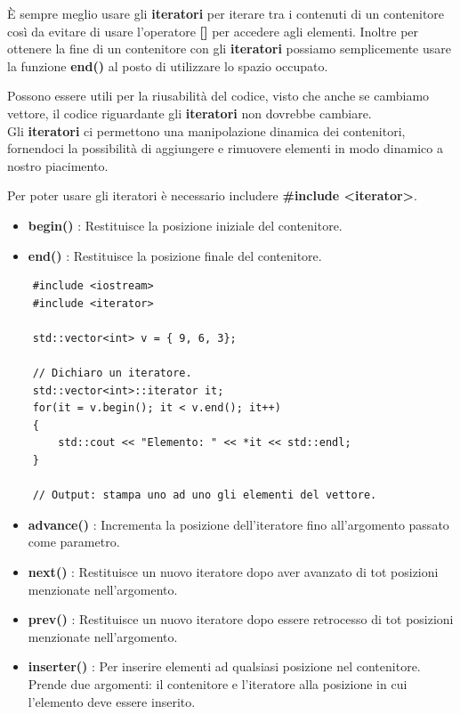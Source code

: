 \vspace{-3.69cm}

\textsf{\small È sempre meglio usare gli \textbf{iteratori} per iterare tra i contenuti di un contenitore così da evitare di usare l'operatore \textbf{[]} per accedere agli elementi. Inoltre per ottenere la fine di un contenitore con gli \textbf{iteratori} possiamo semplicemente usare la funzione \textbf{end()} al posto di utilizzare lo spazio occupato. } \break

\textsf{\small Possono essere utili per la riusabilità del codice, visto che anche se cambiamo vettore, il codice riguardante gli \textbf{iteratori} non dovrebbe cambiare.} \\

\textsf{\small Gli \textbf{iteratori} ci permettono una manipolazione dinamica dei contenitori, fornendoci la possibilità di aggiungere e rimuovere elementi in modo dinamico a nostro piacimento.} \break

\textsf{\small Per poter usare gli iteratori è necessario includere \textbf{\#include <iterator>}.} \\

\begin{itemize}
	\item \textsf{\small \textbf{begin()} : Restituisce la posizione iniziale del contenitore.}
	\item \textsf{\small \textbf{end()} : Restituisce la posizione finale del contenitore.}
\end{itemize}

\begin{lstlisting}
	#include <iostream>
	#include <iterator>
	
	std::vector<int> v = { 9, 6, 3};
	
	// Dichiaro un iteratore.
	std::vector<int>::iterator it;
	for(it = v.begin(); it < v.end(); it++)
	{
		std::cout << "Elemento: " << *it << std::endl;
	}

	// Output: stampa uno ad uno gli elementi del vettore.
\end{lstlisting}

\begin{itemize}
	\item \textsf{\small \textbf{advance()} : Incrementa la posizione dell'iteratore fino all'argomento passato come parametro.}
	\item \textsf{\small \textbf{next()} : Restituisce un nuovo iteratore dopo aver avanzato di tot posizioni menzionate nell'argomento.}
	\item \textsf{\small \textbf{prev()} : Restituisce un nuovo iteratore dopo essere retrocesso di tot posizioni menzionate nell'argomento.}
	\item \textsf{\small \textbf{inserter()} : Per inserire elementi ad qualsiasi posizione nel contenitore. Prende due argomenti: il contenitore e l'iteratore alla posizione in cui l'elemento deve essere inserito.}
\end{itemize}

